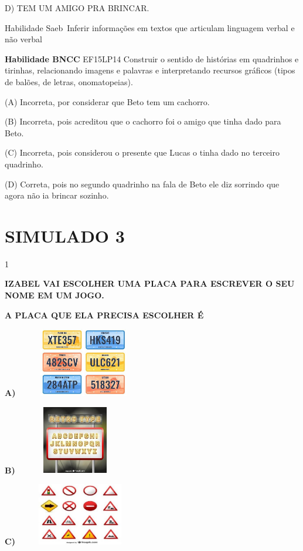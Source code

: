 \begin{escola}
D) TEM UM AMIGO PRA BRINCAR.

Habilidade Saeb~Inferir informações em textos que articulam linguagem
verbal e não verbal

\textbf{Habilidade BNCC} EF15LP14 Construir o sentido de histórias em
quadrinhos e tirinhas, relacionando imagens e palavras e interpretando
recursos gráficos (tipos de balões, de letras, onomatopeias).

(A) Incorreta, por considerar que Beto tem um cachorro.

(B) Incorreta, pois acreditou que o cachorro foi o amigo que tinha dado
para Beto.

(C) Incorreta, pois considerou o presente que Lucas o tinha dado no
terceiro quadrinho.

(D) Correta, pois no segundo quadrinho na fala de Beto ele diz sorrindo
que agora não ia brincar sozinho.


\chapter{SIMULADO 3}

\num{1}

\textbf{IZABEL VAI ESCOLHER UMA PLACA PARA ESCREVER O SEU NOME EM UM
JOGO.}

\textbf{A PLACA QUE ELA PRECISA ESCOLHER É }

\textbf{A)}
\includegraphics[width=2.32569in,height=1.18472in]{media/image222.jpg}

\textbf{B)}
\includegraphics[width=2.03125in,height=1.17361in]{media/image223.jpg}

\textbf{C)}
\includegraphics[width=2.20764in,height=1.07569in]{media/image224.jpg}


\end{escola}
